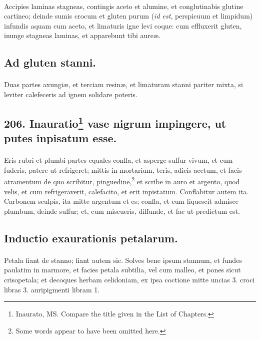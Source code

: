 \documentclass[a4paper, 11pt, oneside, polutonikogreek, italian]{article}
\begin{document}
\paragraph{}
Accipies laminas stagneas, contingis aceto et alumine, et conglutinabis glutine cartineo; deinde sumis crocum et gluten purum (\emph{id est}, perspicuum et limpidum) infundis aquam cum aceto, et limaturis igne levi coque: cum effluxerit gluten, inunge stagneas laminas, et apparebunt tibi aureæ.

\subsection{Ad gluten stanni.}
\paragraph{}
Duas partes axungiæ, et terciam resinæ, et limaturam stanni pariter mixta, si leviter calefeceris ad ignem solidare poteris.

\subsection[206. Inauratio vase nigrum impingere, ut putes inpisatum esse.]{206. Inauratio\footnote{Inaurato, MS. Compare the title given in the List of Chapters.} vase nigrum impingere, ut putes inpisatum esse.}
\paragraph{}
Eris rubri et plumbi partes equales confla, et asperge sulfur vivum, et cum fuderis, patere ut refrigeret; mittis in mortarium, teris, adicis acetum, et facis atramentum de quo scribitur, pinguedine,\footnote{Some words appear to have been omitted here.} et scribe in auro et argento, quod velis, et cum refrigeraverit, calefacito, et erit inpistatum. Conflabitur autem ita. Carbonem sculpis, ita mitte argentum et es; confla, et cum liquescit admisce plumbum, deinde sulfur; et, cum miscueris, diffunde, et fac ut predictum est.

\subsection{Inductio exaurationis petalarum.}
\paragraph{}
Petala fiant de stanno; fiant autem sic. Solves bene ipsum stannum, et fundes paulatim in marmore, et facies petala subtilia, vel cum malleo, et pones sicut crisopetala; et decoques herbam celidoniam, ex ipsa coctione mitte uncias 3. croci libras 3. auripigmenti libram 1.
\end{document}
